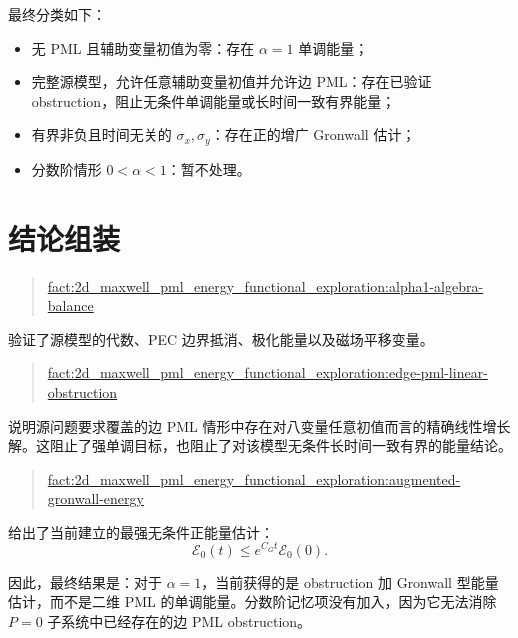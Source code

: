 \documentclass[UTF8,a4paper,12pt]{ctexart}
\newcommand{\sx}{\sigma_x}
\newcommand{\sy}{\sigma_y}
\newcommand{\Ecal}{\mathcal E}
\begin{document}
最终分类如下：
\begin{itemize}
\item 无 PML 且辅助变量初值为零：存在 \(\alpha=1\) 单调能量；
\item 完整源模型，允许任意辅助变量初值并允许边 PML：存在已验证 obstruction，阻止无条件单调能量或长时间一致有界能量；
\item 有界非负且时间无关的 \(\sx,\sy\)：存在正的增广 Gronwall 估计；
\item 分数阶情形 \(0<\alpha<1\)：暂不处理。
\end{itemize}

\section{结论组装}

\begin{quote}\small
\url{fact:2d_maxwell_pml_energy_functional_exploration:alpha1-algebra-balance}
\end{quote}
验证了源模型的代数、PEC 边界抵消、极化能量以及磁场平移变量。

\begin{quote}\small
\url{fact:2d_maxwell_pml_energy_functional_exploration:edge-pml-linear-obstruction}
\end{quote}
说明源问题要求覆盖的边 PML 情形中存在对八变量任意初值而言的精确线性增长解。这阻止了强单调目标，也阻止了对该模型无条件长时间一致有界的能量结论。

\begin{quote}\small
\url{fact:2d_maxwell_pml_energy_functional_exploration:augmented-gronwall-energy}
\end{quote}
给出了当前建立的最强无条件正能量估计：
\[
\Ecal_0(t)\le e^{C_Gt}\Ecal_0(0).
\]

因此，最终结果是：对于 \(\alpha=1\)，当前获得的是 obstruction 加 Gronwall 型能量估计，而不是二维 PML 的单调能量。分数阶记忆项没有加入，因为它无法消除 \(P=0\) 子系统中已经存在的边 PML obstruction。
\end{document}
